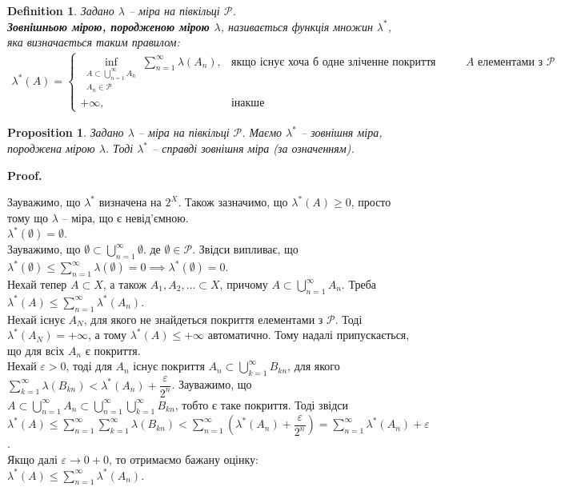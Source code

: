 \documentclass[a4paper, 10pt]{article}
\makeatletter
\theoremstyle{theoremdd}
\newtheorem{definition}[theorem]{Definition}
\newtheorem{proposition}[theorem]{Proposition}
\renewenvironment{proof}[1][Proof.\\]{\par
\pushQED{\hfill \qed}%
\normalfont \topsep6\p@\@plus6\p@\relax
\trivlist
\item\relax
{\bfseries
#1\@addpunct{.}}\hspace\labelsep\ignorespaces
}{%
\popQED\endtrivlist\@endpefalse
}
\makeatother
\begin{document}
\begin{definition}
Задано $\lambda$ -- міра на півкільці $\mathcal{P}$.\\
\textbf{Зовнішньою мірою, породженою мірою $\lambda$}, називається функція множин $\lambda^*$, яка визначається таким правилом:
\begin{align*}
\lambda^*(A) = \begin{cases} \displaystyle\inf_{\substack{A \subset \bigcup_{n=1}^\infty A_n \\ A_n \in \mathcal{P}}} \sum_{n=1}^\infty \lambda(A_n), & \text{якщо існує хоча б одне зліченне покриття множини $A$ елементами з $\mathcal{P}$} \\
+\infty, & \text{інакше} \end{cases}
\end{align*}
\end{definition}

\begin{proposition}
Задано $\lambda$ -- міра на півкільці $\mathcal{P}$. Маємо $\lambda^*$ -- зовнішня міра, породжена мірою $\lambda$. Тоді $\lambda^*$ -- справді зовнішня міра (за означенням).
\end{proposition}

\begin{proof}
Зауважимо, що $\lambda^*$ визначена на $2^X$. Також зазначимо, що $\lambda^*(A) \geq 0$, просто тому що $\lambda$ -- міра, що є невід'ємною.
\bigskip \\
$\lambda^*(\emptyset) = \emptyset$.\\
Зауважимо, що $\emptyset \subset \displaystyle\bigcup_{n=1}^\infty \emptyset$. де $\emptyset \in \mathcal{P}$. Звідси випливає, що $\lambda^*(\emptyset) \leq \displaystyle\sum_{n=1}^\infty \lambda(\emptyset) = 0 \implies \lambda^*(\emptyset) = 0$.
\bigskip \\
Нехай тепер $A \subset X$, а також $A_1,A_2,\dots \subset X$, причому $A \subset \displaystyle\bigcup_{n=1}^\infty A_n$. Треба $\lambda^*(A) \leq \displaystyle\sum_{n=1}^\infty \lambda^*(A_n)$.\\
Нехай існує $A_N$, для якого не знайдеться покриття елементами з $\mathcal{P}$. Тоді $\lambda^*(A_N) = +\infty$, а тому $\lambda^*(A) \leq +\infty$ автоматично. Тому надалі припускається, що для всіх $A_n$ є покриття.\\
Нехай $\varepsilon > 0$, тоді для $A_n$ існує покриття $A_n \subset \displaystyle\bigcup_{k=1}^\infty B_{kn}$, для якого $\displaystyle\sum_{k=1}^\infty \lambda(B_{kn}) < \lambda^*(A_n) + \dfrac{\varepsilon}{2^n}$. Зауважимо, що $A \subset \displaystyle\bigcup_{n=1}^\infty A_n \subset \bigcup_{n=1}^\infty \bigcup_{k=1}^\infty B_{kn}$, тобто є таке покриття. Тоді звідси\\
$\lambda^*(A) \leq \displaystyle\sum_{n=1}^\infty \sum_{k=1}^\infty \lambda(B_{kn}) < \sum_{n=1}^\infty \left( \lambda^*(A_n) + \dfrac{\varepsilon}{2^n} \right) = \sum_{n=1}^\infty \lambda^*(A_n) + \varepsilon$.\\
Якщо далі $\varepsilon \to 0+0$, то отримаємо бажану оцінку:\\
$\lambda^*(A) \leq \displaystyle\sum_{n=1}^\infty \lambda^*(A_n)$.
\end{proof}
\end{document}
